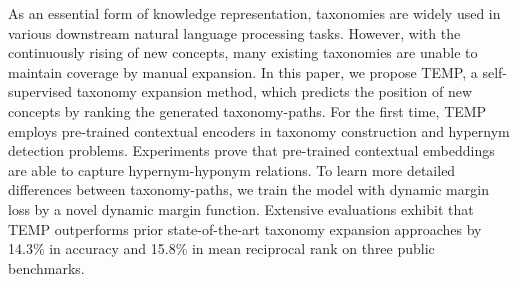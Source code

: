 As an essential form of knowledge representation, taxonomies are widely used in various downstream natural language processing tasks. However, with the continuously rising of new concepts, many existing taxonomies are unable to maintain coverage by manual expansion. In this paper, we propose TEMP, a self-supervised taxonomy expansion method, which predicts the position of new concepts by ranking the generated taxonomy-paths. For the first time, TEMP employs pre-trained contextual encoders in taxonomy construction and hypernym detection problems. Experiments prove that pre-trained contextual embeddings are able to capture hypernym-hyponym relations. To learn more detailed differences between taxonomy-paths, we train the model with dynamic margin loss by a novel dynamic margin function. Extensive evaluations exhibit that TEMP outperforms prior state-of-the-art taxonomy expansion approaches by 14.3\% in accuracy and 15.8\% in mean reciprocal rank on three public benchmarks.
